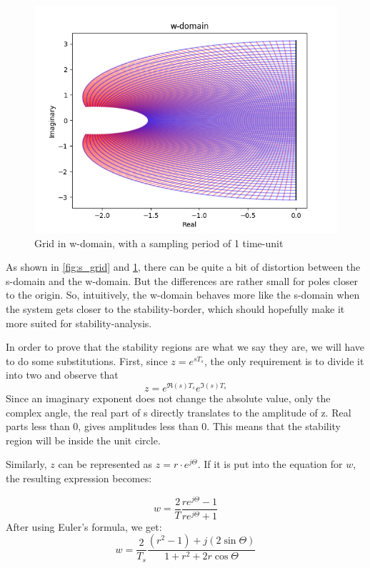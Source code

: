 \begin{figure}
 \centering
 \includegraphics{Figures/w_grid.png}
 \caption{Grid in w-domain, with a sampling period of 1 time-unit}
 \label{fig:w_grid}
\end{figure}{}
As shown in \cref{fig:s_grid} and \ref{fig:w_grid}, there can be quite a bit of distortion between the s-domain and the w-domain. But the differences are rather small for poles closer to the origin. So, intuitively, the w-domain behaves more like the s-domain when the system gets closer to the stability-border, which should hopefully make it more suited for stability-analysis. 

In order to prove that the stability regions are what we say they are, we will have to do some substitutions. First, since $z = e^{s T_s}$, the only requirement is to divide it into two and observe that 
\begin{equation}
 z = e^{\Re{(s )T_s}}e^{\Im{(s )T_s}}
\end{equation}{}
Since an imaginary exponent does not change the absolute value, only the complex angle, the real part of s directly translates to the amplitude of z. Real parts less than 0, gives amplitudes less than 0. This means that the stability region will be inside the unit circle. 


Similarly, $z$ can be represented as $z = r\cdot e^{j\Theta}$. If it is put into the equation for $w$, the resulting expression becomes:

\begin{equation}
 w = \frac{2}{T}\frac{r e^{j \Theta}-1}{re^{j \Theta}+1}
\end{equation}{}
After using Euler's formula, we get: 
\begin{equation}
 w = \frac{2}{T_s} \frac{(r^2 -1) + j( 2\sin{\Theta}) }{1+ r^2 + 2r \cos{\Theta}}
\end{equation}{}

